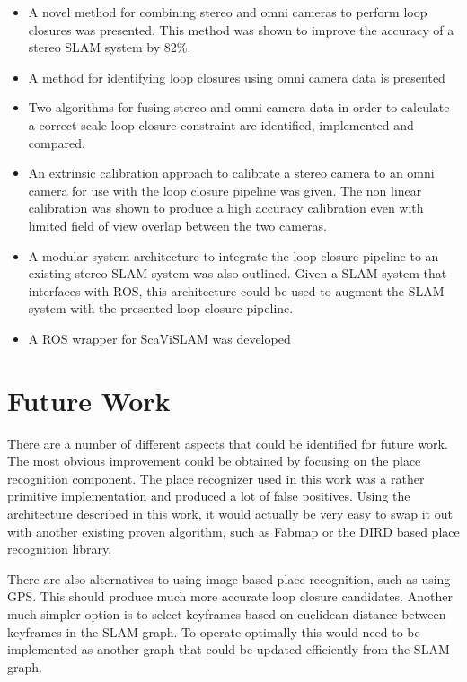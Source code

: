 \begin{itemize}
 \item A novel method for combining stereo and omni cameras to perform loop closures was presented.  This method was shown to improve the accuracy of a stereo SLAM system by 82\%.
 \item A method for identifying loop closures using omni camera data is presented
 \item Two algorithms for fusing stereo and omni camera data in order to calculate a correct scale loop closure constraint are identified, implemented and compared.
 \item An extrinsic calibration approach to calibrate a stereo camera to an omni camera for use with the loop closure pipeline was given.  The non linear calibration was shown to produce a high accuracy calibration even with limited field of view overlap between the two cameras.
 \item A modular system architecture to integrate the loop closure pipeline to an existing stereo SLAM system was also outlined.  Given a SLAM system that interfaces with ROS, this architecture could be used to augment the SLAM system with the presented loop closure pipeline.
 \item A ROS wrapper for ScaViSLAM was developed
\end{itemize}

\section{Future Work}

There are a number of different aspects that could be identified for future work.  The most obvious improvement could be obtained by focusing on the place recognition component.  The place recognizer used in this work was a rather primitive implementation and produced a lot of false positives.  Using the architecture described in this work, it would actually be very easy to swap it out with another existing proven algorithm, such as Fabmap\cite{fabmap} or the DIRD\cite{lategahn_13} based place recognition library.

There are also alternatives to using image based place recognition, such as using GPS.  This should produce much more accurate loop closure candidates.  Another much simpler option is to select keyframes based on euclidean distance between keyframes in the SLAM graph.  To operate optimally this would need to be implemented as another graph that could be updated efficiently from the SLAM graph.


